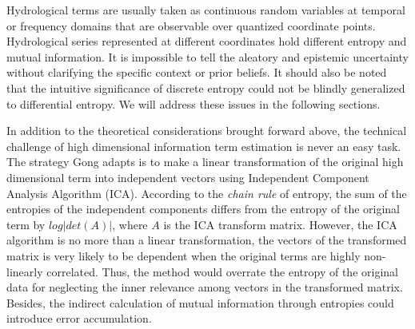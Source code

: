 \documentclass[review]{elsarticle}
\begin{document}
Hydrological terms are usually taken as continuous random variables at temporal or frequency domains that are observable over quantized coordinate points. Hydrological series represented at different coordinates hold different entropy and mutual information. It is impossible to tell the aleatory and epistemic uncertainty without clarifying the specific context or prior beliefs\citep{weijs2013data}. It should also be noted that the intuitive significance of discrete entropy could not be blindly generalized to differential entropy. We will address these issues in the following sections. 

In addition to the theoretical considerations brought forward above, the technical challenge of high dimensional information term estimation is never an easy task. The strategy Gong adapts is to make a linear transformation of the original high dimensional term into independent vectors using Independent Component Analysis  Algorithm (ICA)\citep{hyvarinen2004independent}. According to the \emph{chain rule} of entropy, the sum of the entropies of the independent components differs from the entropy of the original term by $log|det(A)|$, where $A$ is the ICA transform matrix. However, the ICA algorithm is no more than a linear transformation, the vectors of the transformed matrix is very likely to be dependent when the original terms are highly non-linearly correlated. Thus, the method would overrate the entropy of the original data for neglecting the inner relevance among vectors in the transformed matrix. Besides, the indirect calculation of mutual information through entropies could introduce error accumulation.
\end{document}
